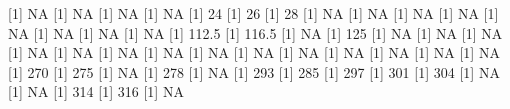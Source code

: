 \documentclass[]{article}
\begin{document}
{[}1{]} NA
{[}1{]} NA
{[}1{]} NA
{[}1{]} NA
{[}1{]} 24
{[}1{]} 26
{[}1{]} 28
{[}1{]} NA
{[}1{]} NA
{[}1{]} NA
{[}1{]} NA
{[}1{]} NA
{[}1{]} NA
{[}1{]} NA
{[}1{]} NA
{[}1{]} 112.5
{[}1{]} 116.5
{[}1{]} NA
{[}1{]} 125
{[}1{]} NA
{[}1{]} NA
{[}1{]} NA
{[}1{]} NA
{[}1{]} NA
{[}1{]} NA
{[}1{]} NA
{[}1{]} NA
{[}1{]} NA
{[}1{]} NA
{[}1{]} NA
{[}1{]} NA
{[}1{]} NA
{[}1{]} NA
{[}1{]} 270
{[}1{]} 275
{[}1{]} NA
{[}1{]} 278
{[}1{]} NA
{[}1{]} 293
{[}1{]} 285
{[}1{]} 297
{[}1{]} 301
{[}1{]} 304
{[}1{]} NA
{[}1{]} NA
{[}1{]} 314
{[}1{]} 316
{[}1{]} NA
\end{document}
